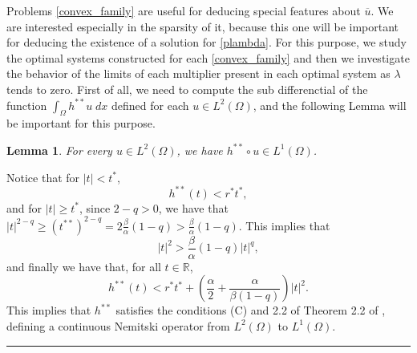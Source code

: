 \documentclass[11pt,a4paper]{amsart}
\newcommand{\kw}{\rule{2mm}{2mm}}
\newcommand{\om}{\Omega}
\renewenvironment{proof}{{Proof.}}{\hfill\kw}
\newtheorem{lemma}{{Lemma}}
\begin{document}
Problems \eqref{convex_family} are useful for deducing special features about $ \overline{u}$. We are interested especially in the sparsity of it, because this one will be important for deducing the existence of a solution for \eqref{plambda}. For this purpose, we study the optimal systems constructed for each \eqref{convex_family} and then we investigate the behavior of the limits of each multiplier present in each optimal system as $\lambda$ tends to zero. First of all, we need to compute the sub differenctial of the function $\int_{\om}h^{**}u\; dx$ defined for each $u\in L^2(\om)$, and the following Lemma will be important for this purpose.\\

 \begin{lemma}
    For every $u\in L^2(\Omega)$, we have $h^{**}\circ u\in L^1(\Omega)$.
\end{lemma}
\begin{proof}
    Notice that for $|t|<t^*$,
    \[
    h^{**}(t)<r^*t^*,
    \]
    and for $|t|\ge t^*$, since $2-q>0$, we have that $|t|^{2-q}\ge(t^{**})^{2-q}=2\frac{\beta}{\alpha}(1-q)>\frac{\beta}{\alpha}(1-q)$. This implies that 
    \[
    |t|^{2}>\frac{\beta}{\alpha}(1-q)|t|^q,
    \]
    and finally we have that, for all $t\in \mathbb{R}$,
    \[
    h^{**}(t)<r^*t^*+\left (\frac{\alpha}{2}+\frac{\alpha}{\beta(1-q)}\right)|t|^2.
    \]
    This implies that $h^{**}$ satisfies the conditions (C) and 2.2 of Theorem 2.2 of \cite{ambrosetti}, defining a continuous Nemitski operator from $L^2(\Omega)$ to $L^1(\Omega)$.
\end{proof}\\   
\end{document}
